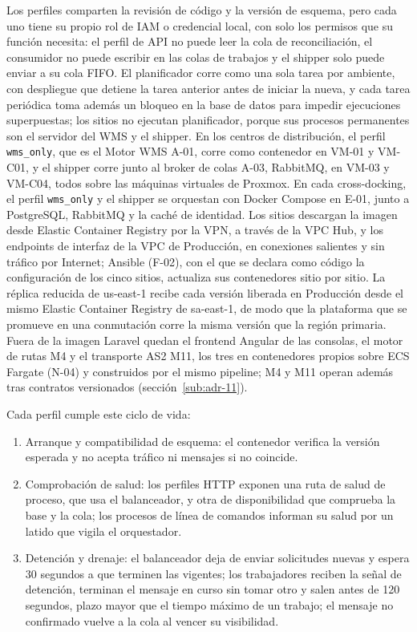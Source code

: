 Los perfiles comparten la revisión de código y la versión de esquema, pero cada uno tiene su propio rol de IAM o credencial local, con solo los permisos que su función necesita: el perfil de API no puede leer la cola de reconciliación, el consumidor no puede escribir en las colas de trabajos y el shipper solo puede enviar a su cola FIFO. El planificador corre como una sola tarea por ambiente, con despliegue que detiene la tarea anterior antes de iniciar la nueva, y cada tarea periódica toma además un bloqueo en la base de datos para impedir ejecuciones superpuestas; los sitios no ejecutan planificador, porque sus procesos permanentes son el servidor del WMS y el shipper. En los centros de distribución, el perfil \texttt{wms\_only}, que es el Motor WMS A-01, corre como contenedor en VM-01 y VM-C01, y el shipper corre junto al broker de colas A-03, RabbitMQ, en VM-03 y VM-C04, todos sobre las máquinas virtuales de Proxmox. En cada cross-docking, el perfil \texttt{wms\_only} y el shipper se orquestan con Docker Compose en E-01, junto a PostgreSQL, RabbitMQ y la caché de identidad. Los sitios descargan la imagen desde Elastic Container Registry por la VPN, a través de la VPC Hub, y los endpoints de interfaz de la VPC de Producción, en conexiones salientes y sin tráfico por Internet; Ansible (F-02), con el que se declara como código la configuración de los cinco sitios, actualiza sus contenedores sitio por sitio. La réplica reducida de us-east-1 recibe cada versión liberada en Producción desde el mismo Elastic Container Registry de sa-east-1, de modo que la plataforma que se promueve en una conmutación corre la misma versión que la región primaria. Fuera de la imagen Laravel quedan el frontend Angular de las consolas, el motor de rutas M4 y el transporte AS2 M11, los tres en contenedores propios sobre ECS Fargate (N-04) y construidos por el mismo pipeline; M4 y M11 operan además tras contratos versionados (sección~\ref{sub:adr-11}).

Cada perfil cumple este ciclo de vida:

\begin{enumerate}
  \item Arranque y compatibilidad de esquema: el contenedor verifica la versión esperada y no acepta tráfico ni mensajes si no coincide.
  \item Comprobación de salud: los perfiles HTTP exponen una ruta de salud de proceso, que usa el balanceador, y otra de disponibilidad que comprueba la base y la cola; los procesos de línea de comandos informan su salud por un latido que vigila el orquestador.
  \item Detención y drenaje: el balanceador deja de enviar solicitudes nuevas y espera 30 segundos a que terminen las vigentes; los trabajadores reciben la señal de detención, terminan el mensaje en curso sin tomar otro y salen antes de 120 segundos, plazo mayor que el tiempo máximo de un trabajo; el mensaje no confirmado vuelve a la cola al vencer su visibilidad.
\end{enumerate}

